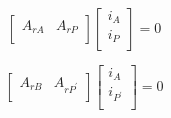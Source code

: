 \documentclass[10pt,psfig,letterpaper,twocolumn]{article}
\begin{document}
\begin{figure}[!ht]
{\centering {} \par}
\caption{}
\label{multi}
\end{figure}

\begin{equation}
\left[\begin{array}{ll}
A_{rA} & A_{rP}\\
\end{array}\right]
\left[\begin{array}{l}
i_{A} \\
i_{P}\\
\end{array}\right]
= 0
\end{equation}

\begin{equation}
\left[\begin{array}{ll}
A_{rB} & A_{rP^{'}}\\
\end{array}\right]
\left[\begin{array}{l}
i_{A} \\
i_{P^{'}}\\
\end{array}\right]
= 0
\end{equation}
\end{document}

